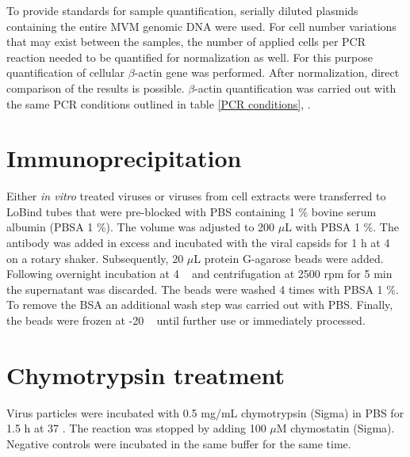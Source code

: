 To provide standards for sample quantification, serially diluted plasmids containing the entire MVM genomic DNA were used.
For cell number variations that may exist between the samples, the number of applied cells per PCR reaction needed to be quantified for normalization as well. For this purpose quantification of cellular $\beta$-actin gene was performed. After normalization, direct comparison of the results is possible. $\beta$-actin quantification was carried out with the same PCR conditions outlined in table \ref{PCR conditions}, \pageref{PCR conditions}.



\section{Immunoprecipitation}
Either \textit{in vitro} treated viruses or viruses from cell extracts were transferred to LoBind tubes that were pre-blocked with PBS containing 1 \% bovine serum albumin (PBSA 1 \%). The volume was adjusted to 200 $\mu$L with PBSA 1 \%. The antibody was added in excess and incubated with the viral capsids for 1 h at 4 \textcelsius~ on a rotary shaker. Subsequently, 20 $\mu$L protein G-agarose beads were added. Following overnight incubation at 4 \textcelsius~ and centrifugation at 2500 rpm for 5 min the supernatant was discarded. The beads were washed 4 times with PBSA 1 \%. To remove the BSA an additional wash step was carried out with PBS. Finally, the beads were frozen at -20 \textcelsius~ until further use or immediately processed. 


\section{Chymotrypsin treatment}

Virus particles were incubated with 0.5 mg/mL chymotrypsin (Sigma) in PBS for 1.5 h at 37 \textcelsius. The reaction was stopped by adding 100 $\mu$M chymostatin (Sigma). Negative controls were incubated in the same buffer for the same time.


\subsection{}
 


\section{}


\subsection{}



\subsection{}

